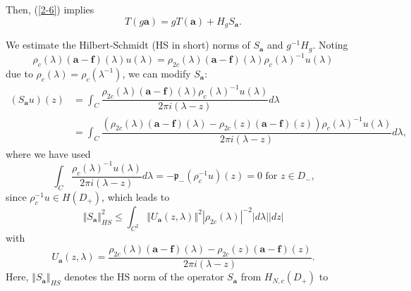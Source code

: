 \documentclass[a4paper]{article}%
\begin{document}
Then, (\ref{2-6}) implies%
\begin{equation}
T\left(  g\boldsymbol{a}\right)  =gT\left(  \boldsymbol{a}\right)
+H_{g}S_{\boldsymbol{a}}\text{.} \label{2-8}%
\end{equation}


We estimate the Hilbert-Schmidt (HS in short) norms of $S_{\boldsymbol{a}}$
and $g^{-1}H_{g}$. Noting%
\[
\rho_{c}\left(  \lambda\right)  \left(  \boldsymbol{a}-\boldsymbol{f}\right)
\left(  \lambda\right)  u\left(  \lambda\right)  =\rho_{2c}\left(
\lambda\right)  \left(  \boldsymbol{a}-\boldsymbol{f}\right)  \left(
\lambda\right)  \rho_{c}\left(  \lambda\right)  ^{-1}u\left(  \lambda\right)
\]
due to $\rho_{c}\left(  \lambda\right)  =\rho_{c}\left(  \lambda^{-1}\right)
$, we can modify $S_{\boldsymbol{a}}$:%
\begin{align*}
\left(  S_{\boldsymbol{a}}u\right)  \left(  z\right)   &  =\int_{C}\dfrac
{\rho_{2c}\left(  \lambda\right)  \left(  \boldsymbol{a}-\boldsymbol{f}%
\right)  \left(  \lambda\right)  \rho_{c}\left(  \lambda\right)  ^{-1}u\left(
\lambda\right)  }{2\pi i\left(  \lambda-z\right)  }d\lambda\\
&  =\int_{C}\dfrac{\left(  \rho_{2c}\left(  \lambda\right)  \left(
\boldsymbol{a}-\boldsymbol{f}\right)  \left(  \lambda\right)  -\rho
_{2c}\left(  z\right)  \left(  \boldsymbol{a}-\boldsymbol{f}\right)  \left(
z\right)  \right)  \rho_{c}\left(  \lambda\right)  ^{-1}u\left(
\lambda\right)  }{2\pi i\left(  \lambda-z\right)  }d\lambda\text{,}%
\end{align*}
where we have used%
\[
\int_{C}\dfrac{\rho_{c}\left(  \lambda\right)  ^{-1}u\left(  \lambda\right)
}{2\pi i\left(  \lambda-z\right)  }d\lambda=-\mathfrak{p}_{-}\left(  \rho
_{c}^{-1}u\right)  \left(  z\right)  =0\text{ \ for }z\in D_{-}\text{,}%
\]
since $\rho_{c}^{-1}u\in H\left(  D_{+}\right)  $, which leads to
\[
\left\Vert S_{\boldsymbol{a}}\right\Vert _{HS}^{2}\leq\int_{C^{2}}\left\Vert
U_{\boldsymbol{a}}\left(  z,\lambda\right)  \right\Vert ^{2}\left\vert
\rho_{2c}\left(  \lambda\right)  \right\vert ^{-2}\left\vert d\lambda
\right\vert \left\vert dz\right\vert
\]
with%
\[
U_{\boldsymbol{a}}\left(  z,\lambda\right)  =\dfrac{\rho_{2c}\left(
\lambda\right)  \left(  \boldsymbol{a}-\boldsymbol{f}\right)  \left(
\lambda\right)  -\rho_{2c}\left(  z\right)  \left(  \boldsymbol{a}%
-\boldsymbol{f}\right)  \left(  z\right)  }{2\pi i\left(  \lambda-z\right)
}\text{.}%
\]
Here, $\left\Vert S_{\boldsymbol{a}}\right\Vert _{HS}$ denotes the HS norm of
the operator $S_{\boldsymbol{a}}$ from $H_{N,c}\left(  D_{+}\right)  $ to
\end{document}
